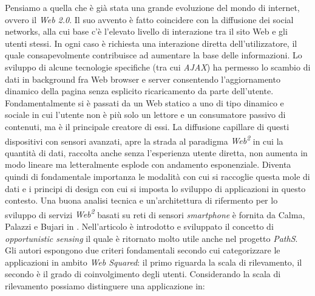 \documentclass[a4paper, 12pt, twoside, openright]{book}
\begin{document}
Pensiamo a quella che è già stata una grande evoluzione del mondo di internet, ovvero il \emph{Web 2.0}. Il suo avvento è fatto coincidere con la diffusione dei social networks, alla cui base c'è l'elevato livello di interazione tra il sito Web e gli utenti stessi. In ogni caso è richiesta una interazione diretta dell'utilizzatore, il quale consapevolmente contribuisce ad aumentare la base delle informazioni. Lo sviluppo di alcune tecnologie specifiche (tra cui \emph{AJAX}) ha permesso lo scambio di dati in background fra Web browser e server consentendo l'aggiornamento dinamico della pagina senza esplicito ricaricamento da parte dell'utente. Fondamentalmente si è passati da un Web statico a uno di tipo dinamico e sociale in cui l'utente non è più solo un lettore e un consumatore passivo di contenuti, ma è il principale creatore di essi.
La diffusione capillare di questi dispositivi con sensori avanzati, apre la strada al paradigma \emph{Web\textsuperscript{2}} in cui la quantità di dati, raccolta anche senza l'esperienza utente diretta, non aumenta in modo lineare ma letteralmente esplode con andamento esponenziale. Diventa quindi di fondamentale importanza le modalità con cui si raccoglie questa mole di dati e i principi di design con cui si imposta lo sviluppo di applicazioni in questo contesto. Una buona analisi tecnica e un'architettura di rifermento per lo sviluppo di servizi \emph{Web\textsuperscript{2}} basati su reti di sensori \emph{smartphone} è fornita da Calma, Palazzi e Bujari in \cite{web2palazzi}. Nell'articolo è introdotto e sviluppato il concetto di \emph{opportunistic sensing} il quale è ritornato molto utile anche nel progetto \emph{PathS}. Gli autori espongono due criteri fondamentali secondo cui categorizzare le applicazioni in ambito \emph{Web Squared}: il primo riguarda la scala di rilevamento, il secondo è il grado di coinvolgimento degli utenti. Considerando la scala di rilevamento possiamo distinguere una applicazione in:
\end{document}
